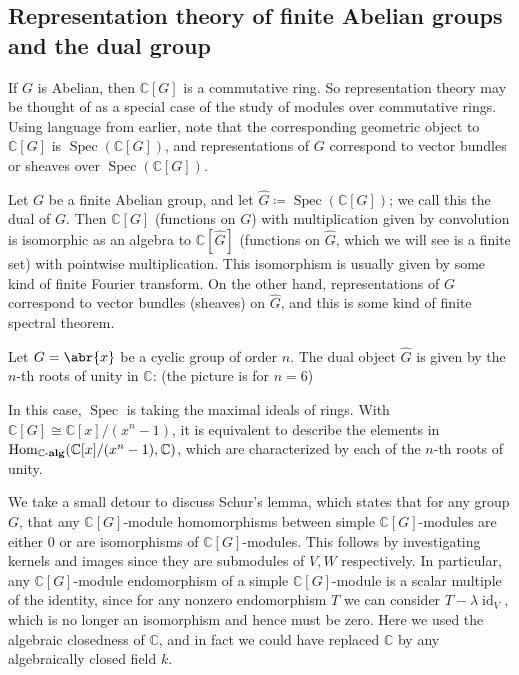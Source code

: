 \documentclass[11pt,leqno]{article}
\theoremstyle{plain}
\theoremstyle{definition}
\numberwithin{equation}{section}
\numberwithin{lem}{section}
\DeclareMathOperator{\Hom}{Hom}
\DeclareMathOperator{\id}{id}
\DeclareMathOperator{\Spec}{Spec}
\newcommand{\catname}[1]{{\normalfont\mathbf{#1}}}
\newcommand{\alg}{\text{-}\catname{alg}}
\begin{document}
\subsection{Representation theory of finite Abelian groups and the dual group}
If $G$ is Abelian, then $\mathbb C[G]$ is a commutative ring. So representation theory may be thought of as a special case of the study of modules over commutative rings. Using language from earlier, note that the corresponding geometric object to $\mathbb C[G]$ is $\Spec(\mathbb C[G])$, and representations of $G$ correspond to vector bundles or sheaves over $\Spec(\mathbb C[G])$.

Let $G$ be a finite Abelian group, and let $\widehat G\coloneqq \Spec(\mathbb C[G])$; we call this the dual of $G$. Then $\mathbb C[G]$ (functions on $G$) with multiplication given by convolution is isomorphic as an algebra to $\mathbb C[\widehat G]$ (functions on $\widehat{G}$, which we will see is a finite set) with pointwise multiplication. This isomorphism is usually given by some kind of finite Fourier transform. On the other hand, representations of $G$ correspond to vector bundles (sheaves) on $\widehat G$, and this is some kind of finite spectral theorem.

Let $G = \abr{x}$ be a cyclic group of order $n$. The dual object $\widehat{G}$ is given by the $n$-th roots of unity in $\mathbb C$: (the picture is for $n=6$)

\begin{figure}[h]
  \centering
\end{figure}

In this case, $\Spec$ is taking the maximal ideals of rings. With $\mathbb C[G]\cong \mathbb C[x]/(x^n-1)$, it is equivalent to describe the elements in $\Hom_{\mathbb C\alg}(\mathbb C[x]/(x^n-1),\mathbb C)$, which are characterized by each of the $n$-th roots of unity.

We take a small detour to discuss Schur's lemma, which states that for any group $G$, that any $\mathbb C[G]$-module homomorphisms between simple $\mathbb C[G]$-modules are either $0$ or are isomorphisms of $\mathbb C[G]$-modules. This follows by investigating kernels and images since they are submodules of $V,W$ respectively. In particular, any $\mathbb C[G]$-module endomorphism of a simple $\mathbb C[G]$-module is a scalar multiple of the identity, since for any nonzero endomorphism $T$ we can consider $T-\lambda \id_V$, which is no longer an isomorphism and hence must be zero. Here we used the algebraic closedness of $\mathbb C$, and in fact we could have replaced $\mathbb C$ by any algebraically closed field $k$.
\end{document}
